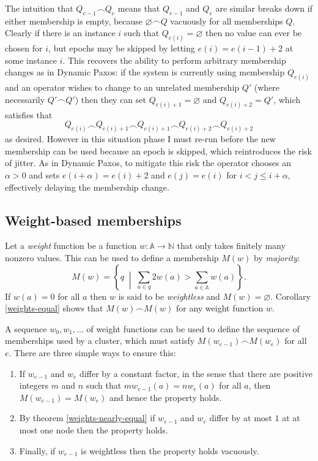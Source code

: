 \documentclass[journal]{IEEEtran}
\begin{document}
The intuition that $Q_{e-1} \frown Q_e$ means that $Q_{e-1}$ and $Q_e$ are
similar breaks down if either membership is empty, because $\varnothing \frown
Q$ vacuously for all memberships $Q$. Clearly if there is an instance $i$ such
that $Q_{e(i)} = \varnothing$ then no value can ever be chosen for $i$, but
epochs may be skipped by letting $e(i) = e(i-1) + 2$ at some instance $i$.
This recovers the ability to perform arbitrary membership changes as in Dynamic
Paxos: if the system is currently using membership $Q_{e(i)}$ and an operator
wishes to change to an unrelated membership $Q'$ (where necessarily $Q' \frown
Q'$) then they can set $Q_{e(i)+1} = \varnothing$ and $Q_{e(i)+2} = Q'$, which
satisfies that \[Q_{e(i)} \frown Q_{e(i) + 1} \frown Q_{e(i)+1} \frown Q_{e(i)
+ 2} \frown Q_{e(i) + 2}\] as desired. However in this situation phase I must
re-run before the new membership can be used because an epoch is skipped, which
reintroduces the risk of jitter. As in Dynamic Paxos, to mitigate this risk the
operator chooses an $\alpha > 0$ and sets $e(i+\alpha) = e(i)+2$ and $e(j) =
e(i)$ for $i < j \le i + \alpha$, effectively delaying the membership change.

\subsection{Weight-based memberships}
\label{weight-based-memberships}

Let a \textit{weight} function be a function $w : \mathbb A \to \mathbb N$ that
only takes finitely many nonzero values. This can be used to define a
membership $M(w)$ by \textit{majority}: \[M(w) = \left\{ q \;\middle|\; \sum_{a
\in q} 2 w(a) > \sum_{a \in \mathbb A} w(a) \right\}.\] If $w(a) = 0$ for all
$a$ then $w$ is said to be \textit{weightless} and $M(w) = \varnothing$.
Corollary \ref{weights-equal} shows that $M(w) \frown M(w)$ for any weight
function $w$.

A sequence $w_0, w_1, \ldots$ of weight functions can be used to define the
sequence of memberships used by a cluster, which must satisfy $M(w_{e-1})
\frown M(w_e)$ for all $e$.  There are three simple ways to ensure this:

\begin{enumerate}

\item If $w_{e-1}$ and $w_e$ differ by a constant factor, in the sense that
there are positive integers $m$ and $n$ such that $m w_{e-1}(a) = n w_e(a)$
for all $a$, then ${M(w_{e-1}) = M(w_e)}$ and hence the property holds.

\item By theorem \ref{weights-nearly-equal} if $w_{e-1}$ and $w_e$
differ by at most $1$ at at most one node then the property holds.

\item Finally, if $w_{e-1}$ is weightless then the property holds vacuously.

\end{enumerate}
\end{document}

